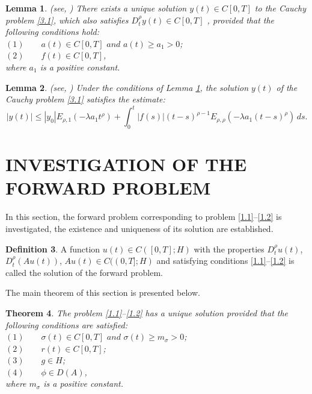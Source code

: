 \documentclass[reqno]{amsart}
\newtheorem{thm}{Theorem}[section]
\newtheorem{lem}[thm]{Lemma}
\theoremstyle{definition}
\newtheorem{defn}[thm]{Definition}
\numberwithin{equation}{section}
\begin{document}
\begin{lem} \label{lem3.2} (see, \cite{SerikbaevRuzhanskyTokmagambetov}) There exists a unique solution $y(t) \in C[0, T]$ to the Cauchy problem \eqref{3.1}, which also satisfies $D_t^{\rho} y(t) \in C[0, T]$ , provided that the following conditions hold:\\
$ (1)\qquad a(t)\in C[0,T] \,\, and \,\, a(t) \ge a_1>0$; \\
$(2) \qquad f(t) \in C[0,T]$,\\
where $a_1$ is a positive constant.
\end{lem}

\begin{lem} (see, \cite{SerikbaevRuzhanskyTokmagambetov})
Under the conditions of Lemma \ref{lem3.2}, the solution $y(t)$ of the Cauchy problem \eqref{3.1} satisfies the estimate:
\begin{equation}\label{3.2}
       \left| y(t) \right| \le \left| y_0 \right| E_{\rho ,1} \left( -\lambda a_1 t^{\rho} \right) + \int_{0}^{t} \left| f(s) \right| (t-s)^{\rho -1} E_{\rho, \rho} \left( -\lambda a_1 (t-s)^{\rho} \right) \, ds.   
\end{equation}
\end{lem}

\section{INVESTIGATION OF THE FORWARD PROBLEM}
In this section, the forward problem corresponding to problem \eqref{1.1}–\eqref{1.2} is investigated, the existence and uniqueness of its solution are established.

\begin{defn} \label{def4.2} A function $u(t) \in {C([0,T];H)}$ with the properties $D_t^{\rho}u(t)$, $D_t^{\rho}(Au(t)) $, $Au(t) \in {C((0,T];H)}$ and satisfying conditions \eqref{1.1}–\eqref{1.2} is called the solution of the forward problem.    
\end{defn}

The main theorem of this section is presented below.

\begin{thm} \label{thm4.3} The problem \eqref{1.1}–\eqref{1.2} has a unique solution provided that the following conditions are satisfied:\\
$ (1)\qquad \sigma(t) \in C[0,T] \,\,and \,\, \sigma(t) \ge m_{\sigma}>0$; \\
$(2) \qquad r(t) \in C[0,T]$;\\
$(3) \qquad g \in H$;\\
$(4) \qquad \phi \in D(A)$,\\
where $m_{\sigma}$ is a positive constant.
\end{thm}
\end{document}
